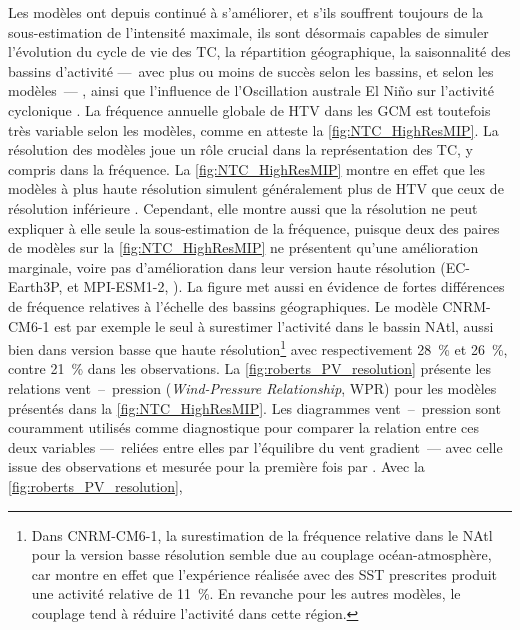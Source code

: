 \documentclass[../main.tex]{subfiles}
\begin{document}
Les modèles ont depuis continué à s'améliorer, et s'ils souffrent toujours de la sous-estimation de l'intensité maximale, ils sont désormais capables de simuler
l'évolution du cycle de vie des TC, la répartition géographique, la saisonnalité des bassins d'activité ---~avec plus ou moins de succès selon les bassins, et
selon les modèles~---
\parencite{bengtsson_tropical_2007,zhao_simulations_2009,shaevitz_characteristics_2014}, ainsi que l'influence de l'Oscillation australe El Niño sur l'activité cyclonique
\parencite{vitart_simulation_1997,gualdi_changes_2008,camargo_experimental_2009}. La fréquence annuelle globale de HTV dans les GCM est toutefois très variable
selon les modèles, comme en atteste la \cref{fig:NTC_HighResMIP}. La résolution des modèles joue un rôle crucial dans la représentation des TC, y compris dans
la fréquence. La \cref{fig:NTC_HighResMIP} montre en effet que les modèles à plus haute résolution simulent généralement plus de HTV que ceux de résolution
inférieure \parencite{camargo_global_2013,roberts_impact_2020}. Cependant, elle montre aussi que la résolution ne peut expliquer à elle seule la sous-estimation
de la fréquence, puisque deux des paires de modèles sur la \cref{fig:NTC_HighResMIP} ne présentent qu'une amélioration marginale, voire pas d'amélioration dans
leur version haute résolution (EC-Earth3P, \cite{haarsma_highresmip_2020} et MPI-ESM1-2, \cite{gutjahr_max_2019}). La figure met aussi en évidence de fortes
différences de fréquence relatives à l'échelle des bassins géographiques. Le modèle CNRM-CM6-1 est par exemple le seul à surestimer l'activité dans le bassin
NAtl, aussi bien dans version basse que haute résolution\footnote{Dans CNRM-CM6-1, la surestimation de la fréquence relative dans le NAtl pour la version basse
    résolution semble due au couplage océan-atmosphère, car \cite{roberts_impact_2020,roberts_projected_2020} montre en effet que l'expérience réalisée avec des
SST prescrites produit une activité relative de \SI{11}{\percent}. En revanche pour les autres modèles, le couplage tend à réduire l'activité dans cette
région.} avec respectivement \SI{28}{\percent} et \SI{26}{\percent}, contre \SI{21}{\percent} dans les observations. La \cref{fig:roberts_PV_resolution}
présente les relations vent~--~pression (\textit{Wind-Pressure Relationship}, WPR) pour les modèles présentés dans la \cref{fig:NTC_HighResMIP}. Les diagrammes
vent~--~pression sont couramment utilisés comme diagnostique pour comparer la relation entre ces deux variables ---~reliées entre elles par l'équilibre du vent
gradient~--- avec celle issue des observations et mesurée pour la première fois par \cite{atkinson_tropical_1977}. Avec la \cref{fig:roberts_PV_resolution},
\end{document}
